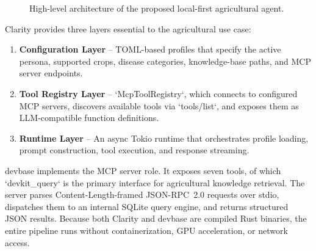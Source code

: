 \documentclass[11pt,a4paper]{article}
\begin{document}
\begin{figure}[htbp]
\centering
{}
\caption{High-level architecture of the proposed local-first agricultural agent.}
\label{fig:architecture}
\end{figure}

Clarity provides three layers essential to the agricultural use case:
\begin{enumerate}[leftmargin=*]
    \item \textbf{Configuration Layer} -- TOML-based profiles that specify the active persona, supported crops, disease categories, knowledge-base paths, and MCP server endpoints.
    \item \textbf{Tool Registry Layer} -- `McpToolRegistry`, which connects to configured MCP servers, discovers available tools via `tools/list`, and exposes them as LLM-compatible function definitions.
    \item \textbf{Runtime Layer} -- An async Tokio runtime that orchestrates profile loading, prompt construction, tool execution, and response streaming.
\end{enumerate}

devbase implements the MCP server role. It exposes seven tools, of which `devkit\_query` is the primary interface for agricultural knowledge retrieval. The server parses Content-Length-framed JSON-RPC~2.0 requests over stdio, dispatches them to an internal SQLite query engine, and returns structured JSON results. Because both Clarity and devbase are compiled Rust binaries, the entire pipeline runs without containerization, GPU acceleration, or network access.
\end{document}
